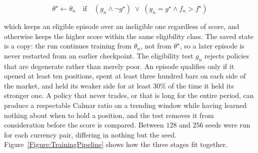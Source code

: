\begin{equation}
\theta^{\star} \leftarrow \theta_n \quad \text{if} \quad (g_n \wedge \neg g^{\star}) \;\vee\; \left(g_n = g^{\star} \wedge f_n > f^{\star}\right)
\label{Equation:KeepBest}
\end{equation}

which keeps an eligible episode over an ineligible one regardless of score, and otherwise keeps the higher score within the same eligibility class. The saved state is a copy: the run continues training from $\theta_n$, not from $\theta^{\star}$, so a later episode is never restarted from an earlier checkpoint. The eligibility test $g_n$ rejects policies that are degenerate rather than merely poor. An episode qualifies only if it opened at least ten positions, spent at least three hundred bars on each side of the market, and held its weaker side for at least $30\%$ of the time it held its stronger one. A policy that never trades, or that is long for the entire period, can produce a respectable Calmar ratio on a trending window while having learned nothing about when to hold a position, and the test removes it from consideration before the score is compared. Between $128$ and $256$ seeds were run for each currency pair, differing in nothing but the seed. Figure~\ref{Figure:TrainingPipeline} shows how the three stages fit together.

